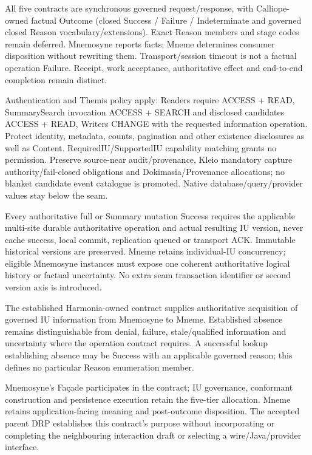 All five contracts are synchronous governed request/response, with Calliope-owned factual Outcome (closed Success / Failure / Indeterminate and governed closed Reason vocabulary/extensions). Exact Reason members and stage codes remain deferred. Mnemosyne reports facts; Mneme determines consumer disposition without rewriting them. Transport/session timeout is not a factual operation Failure. Receipt, work acceptance, authoritative effect and end-to-end completion remain distinct.



Authentication and Themis policy apply: Readers require ACCESS + READ, SummarySearch invocation ACCESS + SEARCH and disclosed candidates ACCESS + READ, Writers CHANGE with the requested information operation. Protect identity, metadata, counts, pagination and other existence disclosures as well as Content. RequiredIU/SupportedIU capability matching grants no permission. Preserve source-near audit/provenance, Kleio mandatory capture authority/fail-closed obligations and Dokimasia/Provenance allocations; no blanket candidate event catalogue is promoted. Native database/query/provider values stay below the seam.



Every authoritative full or Summary mutation Success requires the applicable multi-site durable authoritative operation and actual resulting IU version, never cache success, local commit, replication queued or transport ACK. Immutable historical versions are preserved. Mneme retains individual-IU concurrency; eligible Mnemosyne instances must expose one coherent authoritative logical history or factual uncertainty. No extra seam transaction identifier or second version axis is introduced.



The established Harmonia-owned contract supplies authoritative acquisition of governed IU information from Mnemosyne to Mneme. Established absence remains distinguishable from denial, failure, stale/qualified information and uncertainty where the operation contract requires. A successful lookup establishing absence may be Success with an applicable governed reason; this defines no particular Reason enumeration member.



Mnemosyne's Façade participates in the contract; IU governance, conformant construction and persistence execution retain the five-tier allocation. Mneme retains application-facing meaning and post-outcome disposition. The accepted parent DRP establishes this contract's purpose without incorporating or completing the neighbouring interaction draft or selecting a wire/Java/provider interface.



